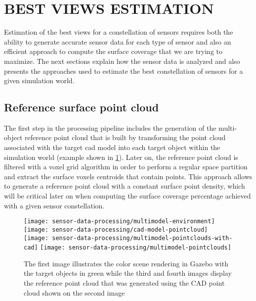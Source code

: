 \section{\uppercase{Best views estimation}}\label{sec:best-views-estimation}

\noindent Estimation of the best views for a constellation of sensors requires both the ability to generate accurate sensor data for each type of sensor and also an efficient approach to compute the surface coverage that we are trying to maximize. The next sections explain how the sensor data is analyzed and also presents the approaches used to estimate the best constellation of sensors for a given simulation world.

\subsection{Reference surface point cloud}

The first step in the processing pipeline includes the generation of the multi-object reference point cloud that is built by transforming the point cloud associated with the target \gls{cad} model into each target object within the simulation world (example shown in \cref{fig:reference-cloud}). Later on, the reference point cloud is filtered with a voxel grid algorithm in order to perform a regular space partition and extract the surface voxels centroids that contain points. This approach allows to generate a reference point cloud with a constant surface point density, which will be critical later on when computing the surface coverage percentage achieved with a given sensor constellation.

\begin{figure}
	\centering
	\texttt{[image: sensor-data-processing/multimodel-environment]}\hspace{2em}
	\texttt{[image: sensor-data-processing/cad-model-pointcloud]}
	\texttt{[image: sensor-data-processing/multimodel-pointclouds-with-cad]}\hspace{2em}
	\texttt{[image: sensor-data-processing/multimodel-pointclouds]}
	\caption{The first image illustrates the color scene rendering in Gazebo with the target objects in green while the third and fourth images display the reference point cloud that was generated using the CAD point cloud shown on the second image}
	\label{fig:reference-cloud}
\end{figure}


